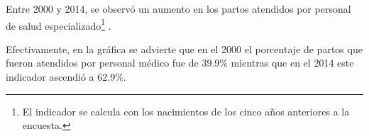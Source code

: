 Entre 2000 y 2014, se observó un aumento en los partos atendidos por personal de salud especializado\footnote{El indicador se calcula con los nacimientos de los cinco años anteriores a la encuesta.} .

 Efectivamente,  en la gráfica se advierte que   en el 2000  el porcentaje de partos que fueron atendidos por personal médico fue de  39.9\%  mientras que en el 2014 este indicador ascendió a 62.9\%. 